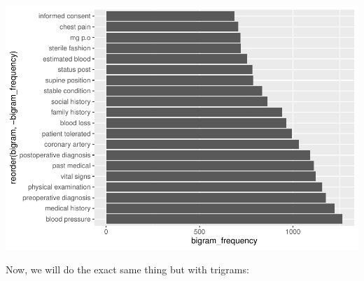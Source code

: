 \documentclass[
]{article}
\begin{document}
\includegraphics{lab08-text-mining_files/figure-latex/unnamed-chunk-11-1.pdf}

Now, we will do the exact same thing but with trigrams:
\end{document}
